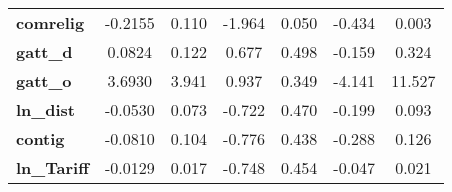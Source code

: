 \begin{center}
\begin{tabular}{lcccccc}
\textbf{comrelig}                                                  &      -0.2155  &        0.110     &    -1.964  &         0.050        &       -0.434    &        0.003     \\
\textbf{gatt\_d}                                                   &       0.0824  &        0.122     &     0.677  &         0.498        &       -0.159    &        0.324     \\
\textbf{gatt\_o}                                                   &       3.6930  &        3.941     &     0.937  &         0.349        &       -4.141    &       11.527     \\
\textbf{ln\_dist}                                                  &      -0.0530  &        0.073     &    -0.722  &         0.470        &       -0.199    &        0.093     \\
\textbf{contig}                                                    &      -0.0810  &        0.104     &    -0.776  &         0.438        &       -0.288    &        0.126     \\
\textbf{ln\_Tariff}                                                &      -0.0129  &        0.017     &    -0.748  &         0.454        &       -0.047    &        0.021     \\
\bottomrule
\end{tabular}
\end{center}